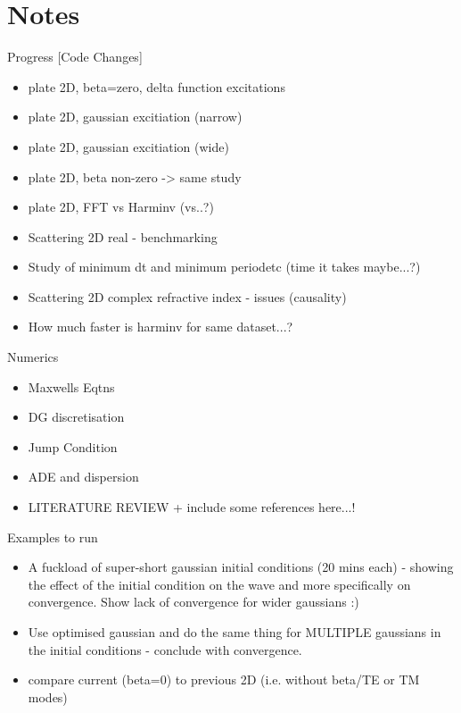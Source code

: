 
\chapter{Notes} %
\label{Chapter2}

Progress [Code Changes]
\begin{itemize}
\item plate 2D, beta=zero, delta function excitations
\item plate 2D, gaussian excitiation (narrow)
\item plate 2D, gaussian excitiation (wide)
\item plate 2D, beta non-zero -> same study
\item plate 2D, FFT vs Harminv (vs..?)
\item Scattering 2D real - benchmarking
\item Study of minimum dt and minimum periodetc (time it takes maybe...?)
\item Scattering 2D complex refractive index - issues (causality)
\item How much faster is harminv for same dataset...?
\end{itemize}

Numerics
\begin{itemize}
\item Maxwells Eqtns
\item DG discretisation
\item Jump Condition
\item ADE and dispersion
\item LITERATURE REVIEW  + include some references here...!
\end{itemize}

Examples to run
\begin{itemize}
\item A fuckload of super-short gaussian initial conditions (20 mins each) - showing the effect of the initial condition on the wave and more specifically on convergence. Show lack of convergence for wider gaussians :)
\item Use optimised gaussian and do the same thing for MULTIPLE gaussians in the initial conditions - conclude with convergence.
\item compare current (beta=0) to previous 2D (i.e. without beta/TE or TM modes)
\end{itemize}

